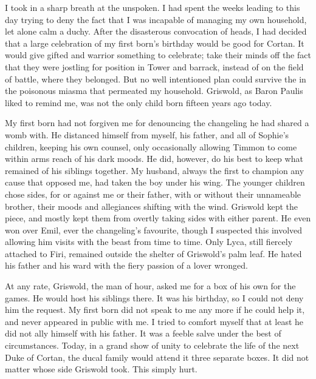 \documentclass{article}
\begin{document}
I took in a sharp breath at the unspoken. I had spent the weeks leading to this day trying to deny the fact that I was incapable of managing my own household, let alone calm a duchy. After the disasterous convocation of heads, I had decided that a large celebration of my first born's birthday would be good for Cortan. It would give gifted and warrior something to celebrate; take their minds off the fact that they were jostling for position in Tower and barrack, instead of on the field of battle, where they belonged. But no well intentioned plan could survive the in the poisonous miasma that permeated my household. Griswold, as Baron Paulis liked to remind me, was not the only child born fifteen years ago today.

My first born had not forgiven me for denouncing the changeling he had shared a womb with. He distanced himself from myself, his father, and all of Sophie's children, keeping his own counsel, only occasionally allowing Timmon to come within arms reach of his dark moods. He did, however, do his best to keep what remained of his siblings together. My husband, always the first to champion any cause that opposed me, had taken the boy under his wing. The younger children chose sides, for or against me or their father, with or without their unnameable brother, their moods and allegiances shifting with the wind. Griswold kept the piece, and mostly kept them from overtly taking sides with either parent. He even won over Emil, ever the changeling's favourite, though I suspected this involved allowing him visits with the beast from time to time. Only Lyca, still fiercely attached to Firi, remained outside the shelter of Griswold's palm leaf. He hated his father and his ward with the fiery passion of a lover wronged.

At any rate, Griswold, the man of hour, asked me for a box of his own for the games. He would host his siblings there. It was his birthday, so I could not deny him the request. My first born did not speak to me any more if he could help it, and never appeared in public with me. I tried to comfort myself that at least he did not ally himself with his father. It was a feeble salve under the best of circumstances. Today, in a grand show of unity to celebrate the life of the next Duke of Cortan, the ducal family would attend it three separate boxes. It did not matter whose side Griswold took. This simply hurt.
\end{document}
